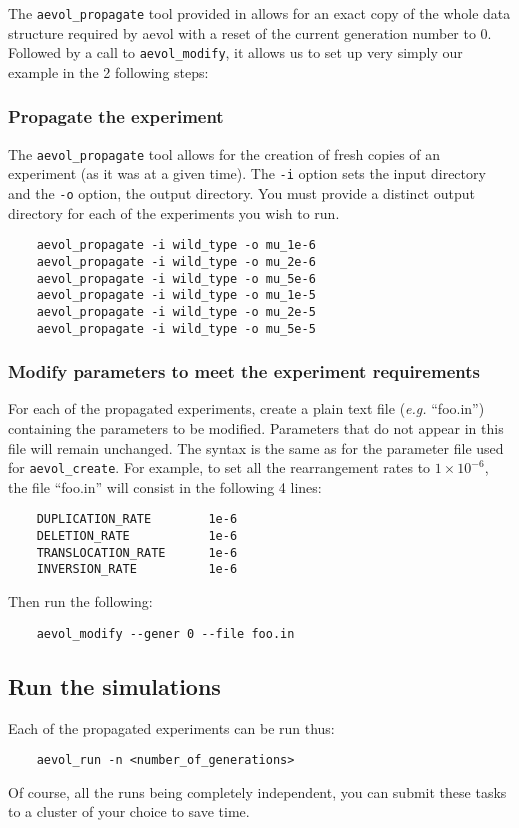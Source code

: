 The \verb?aevol_propagate? tool provided in \aevol{} allows for an exact copy of the whole data structure required by aevol with a reset of the current generation number to 0. Followed by a call to \verb?aevol_modify?, it allows us to set up very simply our example in the 2 following steps:


\subsubsection{Propagate the experiment}
The \verb?aevol_propagate? tool allows for the creation of fresh copies of an experiment (as it was at a given time). The \verb?-i? option sets the input directory and the \verb?-o? option, the output directory. You must provide a distinct output directory for each of the experiments you wish to run.
\begin{verbatim}
	aevol_propagate -i wild_type -o mu_1e-6
	aevol_propagate -i wild_type -o mu_2e-6
	aevol_propagate -i wild_type -o mu_5e-6
	aevol_propagate -i wild_type -o mu_1e-5
	aevol_propagate -i wild_type -o mu_2e-5
	aevol_propagate -i wild_type -o mu_5e-5
\end{verbatim}

\subsubsection{Modify parameters to meet the experiment requirements}
For each of the propagated experiments, create a plain text file (\emph{e.g.} ``foo.in'') containing the parameters to be modified. Parameters that do not appear in this file will remain unchanged. The syntax is the same as for the parameter file used for \verb?aevol_create?. For example, to set all the rearrangement rates to $1\times10^{-6}$, the file ``foo.in'' will consist in the following 4 lines:
\begin{verbatim}
    DUPLICATION_RATE        1e-6
    DELETION_RATE           1e-6
    TRANSLOCATION_RATE      1e-6
    INVERSION_RATE          1e-6
\end{verbatim}
Then run the following:
\begin{verbatim}
	aevol_modify --gener 0 --file foo.in
\end{verbatim}



\subsection{Run the simulations}
Each of the propagated experiments can be run thus:
\begin{verbatim}
	aevol_run -n <number_of_generations>
\end{verbatim}
Of course, all the runs being completely independent, you can submit these tasks to a cluster of your choice to save time.


